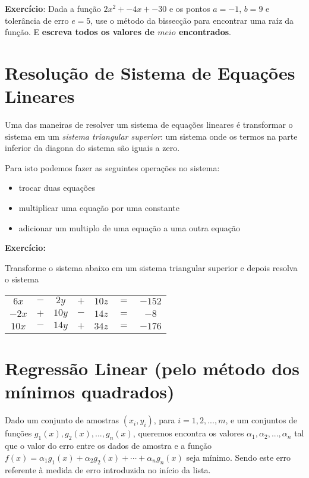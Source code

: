 \documentclass[12pt]{article}
\begin{document}
\textbf{Exercício}: Dada a função $2x^2 + -4x + -30$ e os pontos $a = -1$, $b = 9$ e tolerância de erro $e = 5$, use o método da bissecção para encontrar uma raíz da função. E \textbf{escreva todos os valores de $meio$ encontrados}.




\break





\section{Resolução de Sistema de Equações Lineares}

Uma das maneiras de resolver um sistema de equações lineares é transformar o sistema em um \textit{sistema triangular superior}: um sistema onde os termos na parte inferior da diagona do sistema são iguais a zero.

Para isto podemos fazer as seguintes operações no sistema:
\begin{itemize}
\item trocar duas equações
\item multiplicar uma equação por uma constante
\item adicionar um multiplo de uma equação a uma outra equação
\end{itemize}

\textbf{Exercício: }

Transforme o sistema abaixo em um sistema triangular superior e depois resolva o sistema

\begin{tabular}{ccccccc}
$  6x$ & $-$ & $ 2y$ & $+$ & $10z$ & $=$ & $-152$\\
$ -2x$ & $+$ & $10y$ & $-$ & $14z$ & $=$ & $-8$\\
$ 10x$ & $-$ & $14y$ & $+$ & $34z$ & $=$ & $-176$
\end{tabular}





\break





\section{Regressão Linear (pelo método dos mínimos quadrados)}

Dado um conjunto de amostras $(x_i, y_i)$, para $i = 1, 2, ..., m$, e um conjuntos de funções $g_1(x), g_2(x), ..., g_n(x)$, queremos encontra os valores $\alpha_1, \alpha_2, ..., \alpha_n$ tal que o valor do erro entre os dados de amostra e a função $f(x) = \alpha_1g_1(x) + \alpha_2g_2(x) + \cdots + \alpha_ng_n(x)$ seja mínimo. Sendo este erro referente à medida de erro introduzida no início da lista.
\end{document}
